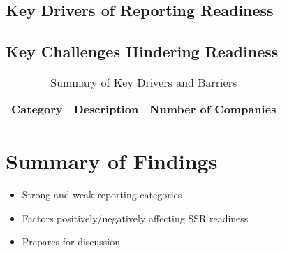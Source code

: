 \subsection{Key Drivers of Reporting Readiness}

\subsection{Key Challenges Hindering Readiness}

\begin{table}[H]
    \centering
    \caption{Summary of Key Drivers and Barriers}
    \begin{tabular}{l l l}
        \textbf{Category} & \textbf{Description} & \textbf{Number of Companies} \\
    \end{tabular}
\end{table}

\section{Summary of Findings}
\begin{itemize}
    \item Strong and weak reporting categories
    \item Factors positively/negatively affecting SSR readiness
    \item Prepares for discussion
\end{itemize}